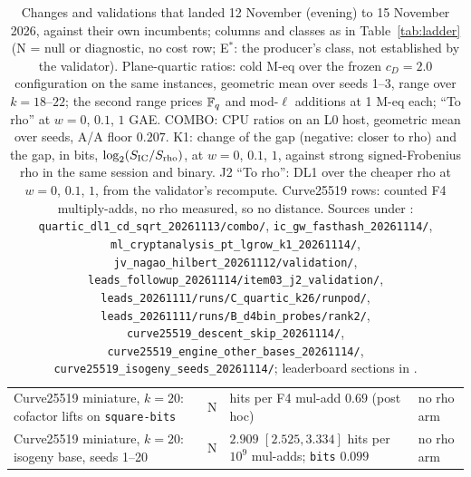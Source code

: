 \begin{table}[p]
\begin{tabularx}{\linewidth}{@{}>{\raggedright}Xl>{\raggedright}p{3.6cm}>{\raggedright\arraybackslash}p{3.4cm}@{}}
Curve25519 miniature, $k=20$: cofactor lifts on \texttt{square-bits} & N & hits per F4 mul-add $0.69$ (post hoc) & no rho arm \\
Curve25519 miniature, $k=20$: isogeny base, seeds 1--20 & N & $2.909$ $[2.525,3.334]$ hits per $10^9$ mul-adds; \texttt{bits} $0.099$ & no rho arm \\
\bottomrule
\end{tabularx}
\caption[]{Changes and validations that landed 12 November (evening) to
15 November 2026, against their own incumbents; columns and classes as in
Table~\ref{tab:ladder} (N = null or diagnostic, no cost row; E$^{*}$: the
producer's class, not established by the validator). Plane-quartic ratios:
cold M-eq over the frozen $c_D=2.0$ configuration on the same instances,
geometric mean over seeds 1--3, range over $k=18$--$22$; the second range
prices $\mathbb{F}_q$ and mod-$\ell$ additions at 1 M-eq each; ``To rho'' at
$w=0$, $0.1$, $1$ GAE. COMBO: CPU ratios on an L0 host, geometric mean over
seeds, A/A floor $0.207$. K1: change of the gap (negative: closer to rho) and the gap, in bits,
$\log_2(S_{\rm IC}/S_{\rm rho})$, at $w=0$, $0.1$, $1$, against strong
signed-Frobenius rho in the same session and binary. J2 ``To rho'': DL1 over
the cheaper rho at $w=0$, $0.1$, $1$, from the validator's recompute.
Curve25519 rows: counted F4 multiply-adds, no rho measured, so no distance.
Sources under :
\texttt{quartic\_dl1\_cd\_sqrt\_20261113/combo/},
\texttt{ic\_gw\_fasthash\_20261114/},
\texttt{ml\_cryptanalysis\_pt\_lgrow\_k1\_20261114/},
\texttt{jv\_nagao\_hilbert\_20261112/validation/},
\texttt{leads\_followup\_20261114/item03\_j2\_validation/},
\texttt{leads\_20261111/runs/C\_quartic\_k26/runpod/},
\texttt{leads\_20261111/runs/B\_d4bin\_probes/rank2/},
\texttt{curve25519\_descent\_skip\_20261114/},
\texttt{curve25519\_engine\_other\_bases\_20261114/},
\texttt{curve25519\_isogeny\_seeds\_20261114/}; leaderboard sections in
.}
\label{tab:ladder5}
\end{table}

